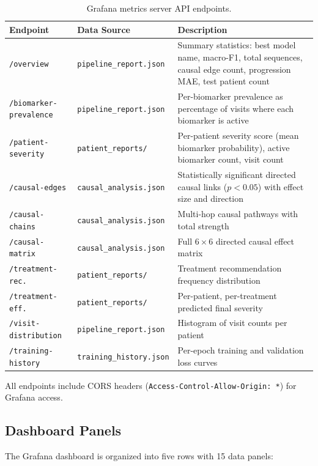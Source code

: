 \documentclass[12pt,a4paper]{article}
\begin{document}
\begin{table}[H]
\centering
\caption{Grafana metrics server API endpoints.}
\small
\begin{tabular}{@{}llp{7cm}@{}}
\toprule
\textbf{Endpoint} & \textbf{Data Source} & \textbf{Description} \\
\midrule
\texttt{/overview} & \texttt{pipeline\_report.json} & Summary statistics: best model name, macro-F1, total sequences, causal edge count, progression MAE, test patient count \\
\texttt{/biomarker-prevalence} & \texttt{pipeline\_report.json} & Per-biomarker prevalence as percentage of visits where each biomarker is active \\
\texttt{/patient-severity} & \texttt{patient\_reports/} & Per-patient severity score (mean biomarker probability), active biomarker count, visit count \\
\texttt{/causal-edges} & \texttt{causal\_analysis.json} & Statistically significant directed causal links ($p < 0.05$) with effect size and direction \\
\texttt{/causal-chains} & \texttt{causal\_analysis.json} & Multi-hop causal pathways with total strength \\
\texttt{/causal-matrix} & \texttt{causal\_analysis.json} & Full $6 \times 6$ directed causal effect matrix \\
\texttt{/treatment-rec.} & \texttt{patient\_reports/} & Treatment recommendation frequency distribution \\
\texttt{/treatment-eff.} & \texttt{patient\_reports/} & Per-patient, per-treatment predicted final severity \\
\texttt{/visit-distribution} & \texttt{pipeline\_report.json} & Histogram of visit counts per patient \\
\texttt{/training-history} & \texttt{training\_history.json} & Per-epoch training and validation loss curves \\
\bottomrule
\end{tabular}
\end{table}

All endpoints include CORS headers (\texttt{Access-Control-Allow-Origin: *}) for Grafana access.

\subsection{Dashboard Panels}

The Grafana dashboard is organized into five rows with 15 data panels:
\end{document}
